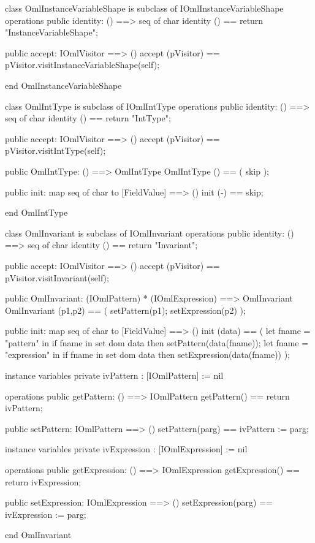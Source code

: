 \begin{vdm_al}
class OmlInstanceVariableShape is subclass of IOmlInstanceVariableShape
operations
  public identity: () ==> seq of char
  identity () == return "InstanceVariableShape";

  public accept: IOmlVisitor ==> ()
  accept (pVisitor) == pVisitor.visitInstanceVariableShape(self);

end OmlInstanceVariableShape
\end{vdm_al}
\begin{vdm_al}
class OmlIntType is subclass of IOmlIntType
operations
  public identity: () ==> seq of char
  identity () == return "IntType";

  public accept: IOmlVisitor ==> ()
  accept (pVisitor) == pVisitor.visitIntType(self);

  public OmlIntType:
      () ==> OmlIntType
  OmlIntType () == 
    ( skip );

  public init: map seq of char to [FieldValue] ==> ()
  init (-) == skip;

end OmlIntType
\end{vdm_al}

\begin{vdm_al}
class OmlInvariant is subclass of IOmlInvariant
operations
  public identity: () ==> seq of char
  identity () == return "Invariant";

  public accept: IOmlVisitor ==> ()
  accept (pVisitor) == pVisitor.visitInvariant(self);

  public OmlInvariant:
      (IOmlPattern) *
      (IOmlExpression) ==> OmlInvariant
  OmlInvariant (p1,p2) == 
   ( setPattern(p1);
     setExpression(p2) );

  public init: map seq of char to [FieldValue] ==> ()
  init (data) ==
    ( let fname = "pattern" in
        if fname in set dom data
        then setPattern(data(fname));
      let fname = "expression" in
        if fname in set dom data
        then setExpression(data(fname)) );

instance variables
  private ivPattern : [IOmlPattern] := nil

operations
  public getPattern: () ==> IOmlPattern
  getPattern() == return ivPattern;

  public setPattern: IOmlPattern ==> ()
  setPattern(parg) == ivPattern := parg;

instance variables
  private ivExpression : [IOmlExpression] := nil

operations
  public getExpression: () ==> IOmlExpression
  getExpression() == return ivExpression;

  public setExpression: IOmlExpression ==> ()
  setExpression(parg) == ivExpression := parg;

end OmlInvariant
\end{vdm_al}

